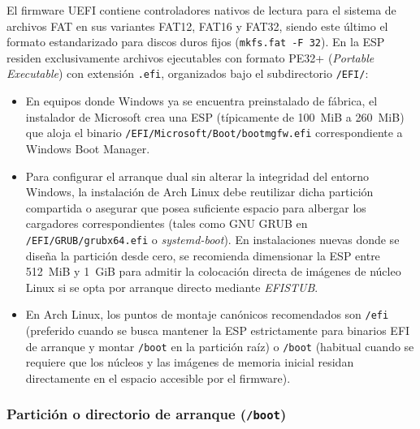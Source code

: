 \documentclass[12pt]{article}
\begin{document}
El firmware UEFI contiene controladores nativos de lectura para el sistema de archivos FAT en sus variantes FAT12, FAT16 y FAT32, siendo este último el formato estandarizado para discos duros fijos (\texttt{mkfs.fat -F 32}). En la ESP residen exclusivamente archivos ejecutables con formato PE32+ (\textit{Portable Executable}) con extensión \texttt{.efi}, organizados bajo el subdirectorio \texttt{/EFI/}:
\begin{itemize}[noitemsep, topsep=2pt]
    \item En equipos donde Windows ya se encuentra preinstalado de fábrica, el instalador de Microsoft crea una ESP (típicamente de 100~MiB a 260~MiB) que aloja el binario \texttt{/EFI/Microsoft/Boot/bootmgfw.efi} correspondiente a Windows Boot Manager.
    \item Para configurar el arranque dual sin alterar la integridad del entorno Windows, la instalación de Arch Linux debe reutilizar dicha partición compartida o asegurar que posea suficiente espacio para albergar los cargadores correspondientes (tales como GNU GRUB en \texttt{/EFI/GRUB/grubx64.efi} o \textit{systemd-boot}). En instalaciones nuevas donde se diseña la partición desde cero, se recomienda dimensionar la ESP entre 512~MiB y 1~GiB para admitir la colocación directa de imágenes de núcleo Linux si se opta por arranque directo mediante \textit{EFISTUB}.
    \item En Arch Linux, los puntos de montaje canónicos recomendados son \texttt{/efi} (preferido cuando se busca mantener la ESP estrictamente para binarios EFI de arranque y montar \texttt{/boot} en la partición raíz) o \texttt{/boot} (habitual cuando se requiere que los núcleos y las imágenes de memoria inicial residan directamente en el espacio accesible por el firmware).
\end{itemize}

\subsubsection{Partición o directorio de arranque (\texttt{/boot})}
\end{document}
